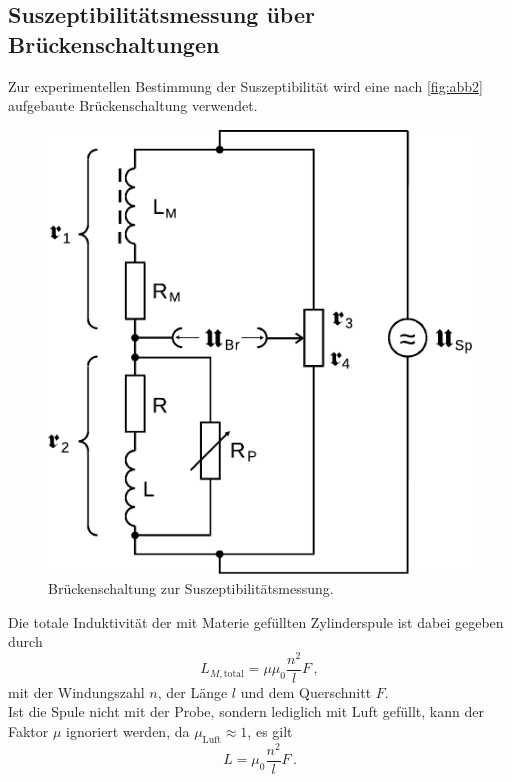 \subsection{Suszeptibilitätsmessung über Brückenschaltungen}

Zur experimentellen Bestimmung der Suszeptibilität wird eine nach \autoref{fig:abb2} aufgebaute Brückenschaltung verwendet.

\begin{figure}
    \centering
    \includegraphics{figures/Abb_2.pdf}
    \caption{Brückenschaltung zur Suszeptibilitätsmessung\cite{ap07}.}
    \label{fig:abb2}
\end{figure}

Die totale Induktivität der mit Materie gefüllten Zylinderspule ist dabei gegeben durch
\begin{equation*}
    L_{M,\text{total}} = \mu \mu_0 \dfrac{n^2}{l} F \,,
    \label{eq:induspu}
\end{equation*}
mit der Windungszahl $n$, der Länge $l$ und dem Querschnitt $F$. \\

Ist die Spule nicht mit der Probe, sondern lediglich mit Luft gefüllt, kann der Faktor $\mu$ ignoriert werden, da $\mu_\text{Luft} \approx 1$, es gilt
\begin{equation*}
    L = \mu_0 \dfrac{n^2}{l} F \,.
\end{equation*} \\

